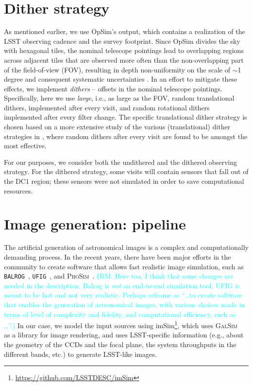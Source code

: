\documentclass[twocolumn]{aastex62}
\newcommand{\rachel}[1]{{\textcolor{cyan}{{\textbf (RM: #1)}}}}
\begin{document}
\section{Dither strategy}
\label{sec:dithering}

As mentioned earlier, we use OpSim's output, which contains a realization of the LSST observing cadence and the survey footprint. Since OpSim divides the sky with hexagonal tiles, the nominal telescope pointings lead to overlapping regions across adjacent tiles that are observed more often than the non-overlapping part of the field-of-view (FOV), resulting in depth non-uniformity on the scale of $\sim$1 degree and consequent systematic uncertainties \citep{2016ApJ...829...50A}. In an effort to mitigate these effects, we implement \textit{dithers} -- offsets in the nominal telescope pointings. Specifically, here we use \textit{large}, i.e., as large as the FOV, random translational dithers, implemented after every visit, and random rotational dithers implemented after every filter change. The specific translational dither strategy is chosen based on a more extensive study of the various (translational) dither strategies in \citet{2016ApJ...829...50A}, where random dithers after every visit are found to be amongst the most effective.

For our purposes, we consider both the undithered and the dithered observing strategy. For the dithered strategy, some visits will contain sensors that fall out of the DC1 region; these sensors were not simulated in order to save computational resources.

\section{Image generation: pipeline}
\label{sec:image_generation_pipeline}

The artificial generation of astronomical images is a complex and computationally demanding process. In the recent
years, there have been major efforts in the community to create software that allows fast realistic image
simulation, such as \texttt{BALROG}~\citep{2016MNRAS.457..786S}, \texttt{UFIG}~\citep{2016ApJ...817...25B}, and \textsc{PhoSim}~\citep{2015ApJS..218...14P}. \rachel{Here too, I think that some changes are needed in the description.  Balrog is {\em not} an end-to-end simulation tool; UFIG is meant to be fast and not very realistic.  Perhaps reframe as ``\dots to create software that enables the generation of astronomical images, with various choices made in terms of level of complexity and fidelity, and computational efficiency, such as \dots''.} In our case, we model the input sources using imSim\footnote{\url{https://github.com/LSSTDESC/imSim}}, which uses \textsc{GalSim}~\citep{2015A&C....10..121R} as a library for image rendering, and uses LSST-specific information (e.g., about the geometry of the CCDs and the focal plane, the system throughputs in the different bands, etc.) to generate LSST-like images.
\end{document}
